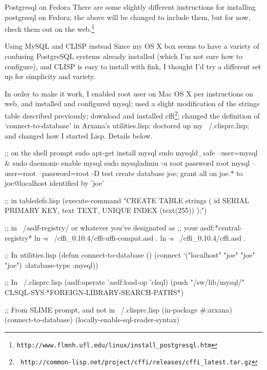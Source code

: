 \begin{notate}{Postgresql on Fedora}
There are some slightly different instructions for
installing postgresql on Fedora; the above will be
changed to include them, but for now, check them
out on the
web.\footnote{{\tt http://www.flmnh.ufl.edu/linux/install\_postgresql.htm}}
\end{notate}

\begin{notate}{Using MySQL and CLISP instead} \label{backend-variant}
Since my OS X box seems to have a variety of confusing
PostgreSQL systems already installed (which I'm not sure
how to configure), and CLISP is easy to install with fink,
I thought I'd try a different set up for simplicity and
variety.

In order to make it work, I enabled root user on Mac OS X
per instructions on web, and installed and configured
mysql; used a slight modification of the strings table
described previously; download and installed
cffi\footnote{{\tt
    http://common-lisp.net/project/cffi/releases/cffi\_latest.tar.gz}};
changed the definition of `connect-to-database' in
Arxana's utilities.lisp; doctored up my ~/.clisprc.lisp;
and changed how I started Lisp.  Details below.
\end{notate}

\begin{idea}
;; on the shell prompt
sudo apt-get install mysql
sudo mysqld_safe --user=mysql &
sudo daemonic enable mysql
sudo mysqladmin -u root password root
mysql --user=root --password=root -D test
create database joe; grant all on joe.* to joe@localhost
identified by 'joe'

;; in tabledefs.lisp
(execute-command "CREATE TABLE strings (
   id SERIAL PRIMARY KEY,
   text TEXT,
   UNIQUE INDEX (text(255))
);")

;; in ~/asdf-registry/ or whatever you've designated as
;; your asdf:*central-registry*
ln -s ~/cffi_0.10.4/cffi-uffi-compat.asd .
ln -s ~/cffi_0.10.4/cffi.asd .

;; In utilities.lisp
(defun connect-to-database ()
   (connect `("localhost" "joe" "joe" "joe")
            :database-type :mysql))

;; In ~/.clisprc.lisp
(asdf:operate 'asdf:load-op 'clsql)
(push "/sw/lib/mysql/"
CLSQL-SYS:*FOREIGN-LIBRARY-SEARCH-PATHS*)

;; From SLIME prompt, and not in ~/.clisprc.lisp
(in-package #:arxana)
(connect-to-database)
(locally-enable-sql-reader-syntax)
\end{idea}

